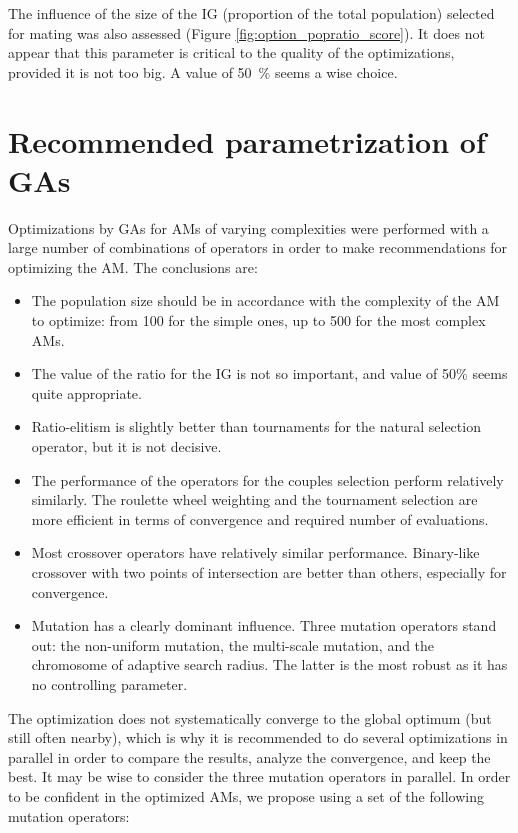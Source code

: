 \documentclass{ametsoc}
\begin{document}
The influence of the size of the IG (proportion of the total population) selected for mating was also assessed (Figure \ref{fig:option_popratio_score}). It does not appear that this parameter is critical to the quality of the optimizations, provided it is not too big. A value of 50~\% seems a wise choice.


\section{Recommended parametrization of GAs}
\label{sec:recommendations}

Optimizations by GAs for AMs of varying complexities were performed with a large number of combinations of operators in order to make recommendations for optimizing the AM. The conclusions are:

\begin{itemize}
	\item The population size should be in accordance with the complexity of the AM to optimize: from 100 for the simple ones, up to 500 for the most complex AMs.
	
	\item The value of the ratio for the IG is not so important, and value of 50\% seems quite appropriate.
	
	\item Ratio-elitism is slightly better than tournaments for the natural selection operator, but it is not decisive.
	
	\item The performance of the operators for the couples selection perform relatively similarly. The roulette wheel weighting and the tournament selection are more efficient in terms of convergence and required number of evaluations.
	
	\item Most crossover operators have relatively similar performance. Binary-like crossover with two points of intersection are better than others, especially for convergence.
	
	\item Mutation has a clearly dominant influence. Three mutation operators stand out: the non-uniform mutation, the multi-scale mutation, and the chromosome of adaptive search radius. The latter is the most robust as it has no controlling parameter.
	
\end{itemize}

The optimization does not systematically converge to the global optimum (but still often nearby), which is why it is recommended to do several optimizations in parallel in order to compare the results, analyze the convergence, and keep the best. It may be wise to consider the three mutation operators in parallel. In order to be confident in the optimized AMs, we propose using a set of the following mutation operators:
\end{document}
